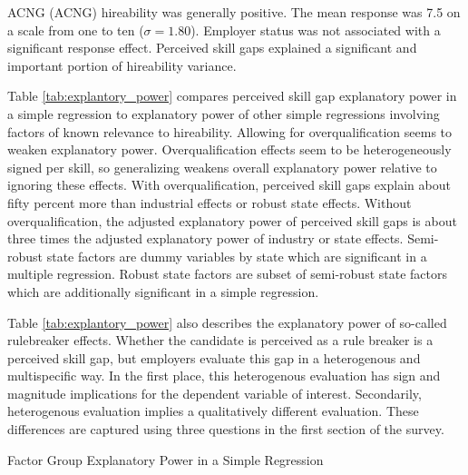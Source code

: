 \documentclass[review]{elsarticle}
\begin{document}


ACNG (ACNG) hireability was generally positive.
The mean response was 7.5 on a scale from one to ten ($\sigma = 1.80$).
Employer status was not associated with a significant response effect.
Perceived skill gaps explained a significant and important portion of hireability variance.

Table \ref{tab:explantory_power} compares perceived skill gap explanatory power in a simple regression
to explanatory power of other simple regressions involving factors of known relevance to hireability.
Allowing for overqualification seems to weaken explanatory power.
Overqualification effects seem to be heterogeneously signed per skill, so generalizing weakens overall explanatory power relative to ignoring these effects.
With overqualification, perceived skill gaps explain about fifty percent more than industrial effects or robust state effects.
Without overqualification, the adjusted explanatory power of perceived skill gaps is about three times the adjusted explanatory power of industry or state effects.
Semi-robust state factors are dummy variables by state which are significant in a multiple regression.
Robust state factors are subset of semi-robust state factors which are additionally significant in a simple regression.

Table \ref{tab:explantory_power} also describes the explanatory power of so-called rulebreaker effects.
Whether the candidate is perceived as a rule breaker is a perceived skill gap, but employers evaluate this gap in a heterogenous and multispecific way.
In the first place, this heterogenous evaluation has sign and magnitude implications for the dependent variable of interest.
Secondarily, heterogenous evaluation implies a qualitatively different evaluation.
These differences are captured using three questions in the first section of the survey.

\begin{table}
    \caption{Factor Group Explanatory Power in a Simple Regression}
    \resizebox{\columnwidth}{!}{
        
    }
    \label{tab:explantory_power}
\end{table}
\end{document}
